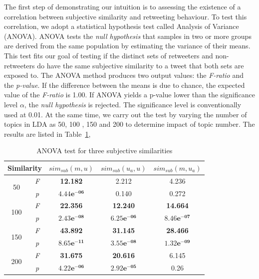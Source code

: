 \documentclass[letterpaper]{article}
\begin{document}
The first step of demonstrating our intuition is to assessing the existence of a correlation between subjective similarity and retweeting behaviour. 
To test this correlation, we adopt a statistical hypothesis test called Analysis of Variance (ANOVA). 
ANOVA tests the \textit{null hypothesis} that samples in two or more groups are derived from the same population by estimating the variance of their means. This test fits our goal of testing if the distinct sets of retweeters and non-retweeters do have the same subjective similarity to a tweet that both sets are exposed to. 
The ANOVA method produces two output values: the \textit{F-ratio} and the \textit{p-value}. 
If the difference between the means is due to chance, the expected value of the \textit{F-ratio} is 1.00. 
If ANOVA yields a p-value lower than the significance level $ \alpha $, the \textit{null hypothesis} is rejected. 
The significance level is conventionally used at 0.01.
At the same time, we carry out the test by varying the number of topics in LDA as 50, 100 , 150 and 200 to determine impact of topic number. 
The results are listed in Table~\ref{tab2}, 
\begin{table}[h]
\scriptsize
\centering
\caption{ANOVA test for three subjective similarities}
\label{tab2}
\begin{tabular}{|c|c|c|c|c|}
\hline
\multicolumn{2}{|c|}{Similarity}& $ sim_{sub} \left( m,u \right) $ & $ sim_{sub}\left( u_{a},u \right)  $ & $ sim_{sub}\left( m,u_{a} \right)  $\\
\hline
\multirow{2}{*}{50} & \textit{F} & \textbf{12.182} & 2.212 & 4.236 \\
\cline{2-5}
  & \textit{p} &  $\mathbf{4.44e^{-06}}$  & 0.140 & 0.272\\
\hline
\multirow{2}{*}{100} & \textit{F} & \textbf{22.356} & \textbf{12.240} & \textbf{14.664} \\
\cline{2-5}
  & \textit{p} &  $\mathbf{2.43e^{-08}}$  & $\mathbf{6.25e^{-06}}$ & $\mathbf{8.46e^{-07}}$\\
\hline
\multirow{2}{*}{150} & \textit{F} & \textbf{43.892} & \textbf{31.145} & \textbf{28.466} \\
\cline{2-5}
  & \textit{p} &  $\mathbf{8.65e^{-11}}$  & $\mathbf{3.55e^{-08}}$ & $\mathbf{1.32e^{-09}}$\\
\hline
\multirow{2}{*}{200} & \textit{F} & \textbf{31.675} & \textbf{20.616} & 6.145\\
\cline{2-5}
  & \textit{p} &  $\mathbf{4.22e^{-06}}$  & $\mathbf{2.92e^{-05}}$ & 0.26\\
\hline
\end{tabular}
\end{table}
\end{document}
